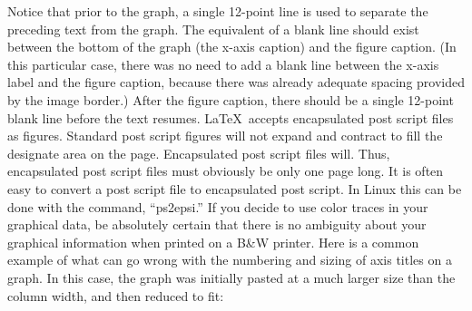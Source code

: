 \documentclass[conference]{IEEEtran}
\begin{document}
{Notice that prior to the graph, a single 12-point line is used to
separate the preceding text from the graph. The equivalent of a blank
line should exist between the bottom of the graph (the x-axis caption)
and the figure caption. (In this particular case, there was no need to
add a blank line between the x-axis label and the figure caption,
because there was already adequate spacing provided by the image
border.) After the figure caption, there should be a single 12-point
blank line before the text resumes. \LaTeX\ accepts encapsulated
post script files as figures.  Standard post script figures will not
expand and contract to fill the designate area on the page.
Encapsulated post script files will.  Thus, encapsulated post script
files must obviously be only one page long.  It is often easy to convert a post
script file to encapsulated post script.  In Linux this can be done
with the command, ``ps2epsi.''
If you decide to use color traces in your graphical data, be absolutely certain that there is no ambiguity about your graphical information when printed on a B\&W printer.
Here is a common example of what can go wrong with the numbering and sizing of axis titles on a graph. In this case, the graph was initially pasted at a much larger size than the column width, and then reduced to fit:
	
}
\end{document}
